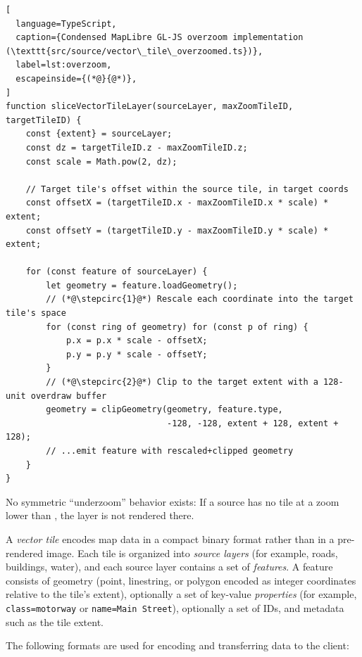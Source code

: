 \clearpage
\begin{lstlisting}[
  language=TypeScript,
  caption={Condensed MapLibre GL-JS overzoom implementation (\texttt{src/source/vector\_tile\_overzoomed.ts})},
  label=lst:overzoom,
  escapeinside={(*@}{@*)},
]
function sliceVectorTileLayer(sourceLayer, maxZoomTileID, targetTileID) {
    const {extent} = sourceLayer;
    const dz = targetTileID.z - maxZoomTileID.z;
    const scale = Math.pow(2, dz);

    // Target tile's offset within the source tile, in target coords
    const offsetX = (targetTileID.x - maxZoomTileID.x * scale) * extent;
    const offsetY = (targetTileID.y - maxZoomTileID.y * scale) * extent;

    for (const feature of sourceLayer) {
        let geometry = feature.loadGeometry();
        // (*@\stepcirc{1}@*) Rescale each coordinate into the target tile's space
        for (const ring of geometry) for (const p of ring) {
            p.x = p.x * scale - offsetX;
            p.y = p.y * scale - offsetY;
        }
        // (*@\stepcirc{2}@*) Clip to the target extent with a 128-unit overdraw buffer
        geometry = clipGeometry(geometry, feature.type,
                                -128, -128, extent + 128, extent + 128);
        // ...emit feature with rescaled+clipped geometry
    }
}
\end{lstlisting}

No symmetric \enquote{underzoom} behavior exists:
If a source has no tile at a zoom lower than , the layer is  not rendered there.

A \emph{vector tile} encodes map data in a compact binary format rather than in a pre-rendered image.
Each tile is organized into \emph{source layers} (for example, roads, buildings, water), and each source layer contains a set of \emph{features}.
A feature consists of geometry (point, linestring, or polygon encoded as integer coordinates relative to the tile's extent), optionally a set of key-value \emph{properties} (for example, \texttt{class=motorway} or \texttt{name=Main~Street}), optionally a set of IDs, and metadata such as the tile extent.

The following formats are used for encoding and transferring data to the client:

